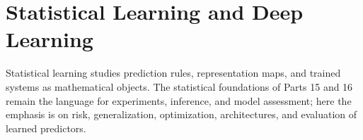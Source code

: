 \part{Statistical Learning and Deep Learning}

Statistical learning studies prediction rules, representation maps, and trained systems as mathematical objects.  The statistical foundations of Parts 15 and 16 remain the language for experiments, inference, and model assessment; here the emphasis is on risk, generalization, optimization, architectures, and evaluation of learned predictors.









